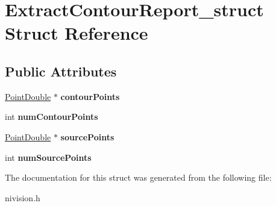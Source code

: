\hypertarget{structExtractContourReport__struct}{
\section{ExtractContourReport\_\-struct Struct Reference}
\label{structExtractContourReport__struct}
}
\subsection*{Public Attributes}
\begin{DoxyCompactItemize}
\item 
\hypertarget{structExtractContourReport__struct_a97e0fd702b4df12c6c19097eeed392eb}{
\hyperlink{structPointDouble__struct}{PointDouble} $\ast$ {\bfseries contourPoints}}
\label{structExtractContourReport__struct_a97e0fd702b4df12c6c19097eeed392eb}

\item 
\hypertarget{structExtractContourReport__struct_a998d6524e499e5e6c8d81b4f91681143}{
int {\bfseries numContourPoints}}
\label{structExtractContourReport__struct_a998d6524e499e5e6c8d81b4f91681143}

\item 
\hypertarget{structExtractContourReport__struct_a125c4b9d17563dbf10881888c7be951e}{
\hyperlink{structPointDouble__struct}{PointDouble} $\ast$ {\bfseries sourcePoints}}
\label{structExtractContourReport__struct_a125c4b9d17563dbf10881888c7be951e}

\item 
\hypertarget{structExtractContourReport__struct_a4cfc1639854be2e407c657db95a91859}{
int {\bfseries numSourcePoints}}
\label{structExtractContourReport__struct_a4cfc1639854be2e407c657db95a91859}

\end{DoxyCompactItemize}


The documentation for this struct was generated from the following file:\begin{DoxyCompactItemize}
\item 
nivision.h\end{DoxyCompactItemize}
